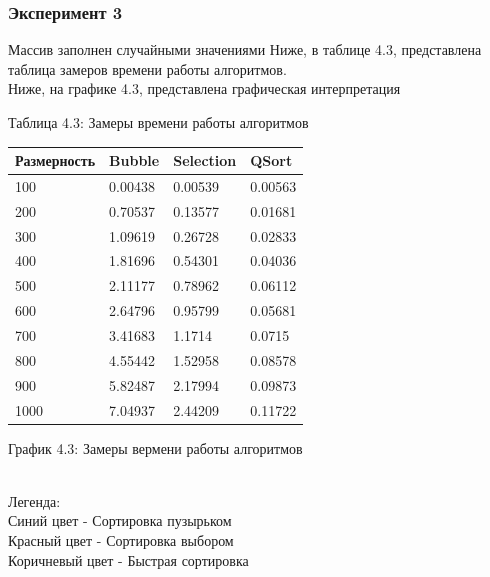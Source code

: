 \documentclass[12pt,a4paper]{article}
\numberwithin{equation}{section}
\begin{document}
\subsubsection{Эксперимент 3}
\qquad Массив заполнен случайными значениями
\qquad Ниже, в таблице 4.3, представлена таблица замеров времени работы алгоритмов.\\
\qquad Ниже, на графике 4.3, представлена графическая интерпретация\\
\begin{center}
	Таблица 4.3: Замеры времени работы алгоритмов
	\begin{tabular}{| l | | l | l | l |}
		\hline
		Размерность & Bubble & Selection & QSort\\\hline
		100 & 0.00438 & 0.00539 & 0.00563\\\hline
		200 & 0.70537 & 0.13577 & 0.01681\\\hline
		300 & 1.09619 & 0.26728 & 0.02833\\\hline
		400 & 1.81696 & 0.54301 & 0.04036\\\hline
		500 & 2.11177 & 0.78962 & 0.06112\\\hline
		600 & 2.64796 & 0.95799 & 0.05681\\\hline
		700 & 3.41683 & 1.1714 & 0.0715\\\hline
		800 & 4.55442 & 1.52958 & 0.08578\\\hline
		900 & 5.82487 & 2.17994 & 0.09873\\\hline
		1000 & 7.04937 & 2.44209 & 0.11722\\\hline
	\end{tabular}
\end{center}
\begin{center}
	График 4.3: Замеры вермени работы алгоритмов\\
	\\
	Легенда:\\
	Синий цвет - Сортировка пузырьком\\
	Красный цвет - Сортировка выбором\\
	Коричневый цвет - Быстрая сортировка\\
\end{center}
\end{document}
